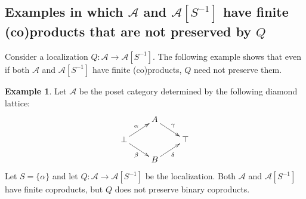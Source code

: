 \documentclass[10pt,a4paper]{amsart}
\theoremstyle{plain}
\theoremstyle{definition}
\newtheorem{example}[theorem]{Example}
\theoremstyle{remark}
\begin{document}
\subsection{Examples in which \texorpdfstring{$\mathcal{A}$}{} and \texorpdfstring{$\mathcal{A}[S^{-1}]$}{} have finite (co)products that are not preserved by \texorpdfstring{$Q$}{}}

Consider a localization $Q:\mathcal A\longrightarrow\mathcal A[S^{-1}]$.
The following example shows that even if both $\mathcal{A}$ and $\mathcal{A}[S^{-1}]$ have finite (co)products, $Q$ need not preserve them.

\begin{example}\label{ex:diamond-lattice}
  Let $\mathcal A$ be the poset category determined by the following diamond lattice:
  \[
    \xymatrix@C=8mm@R=4mm{
    &A\ar[dr]^{\gamma}&\\
    \bot\ar[ur]^{\alpha}\ar[dr]_{\beta}&&\top\\
    &B\ar[ur]_{\delta}&
    }
  \]
  Let $S=\{\alpha\}$ and let $Q:\mathcal A\longrightarrow\mathcal A[S^{-1}]$ be the localization.
  Both $\mathcal A$ and $\mathcal A[S^{-1}]$ have finite coproducts, but $Q$ does not preserve binary coproducts.


\end{example}
\end{document}
